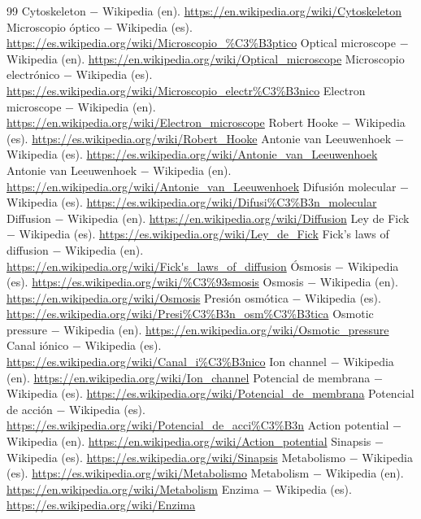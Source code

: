 \documentclass{book}
\begin{document}
\begin{thebibliography}{99}
 Cytoskeleton \(-\) Wikipedia (en). \url{https://en.wikipedia.org/wiki/Cytoskeleton}
 Microscopio óptico \(-\) Wikipedia (es). \url{https://es.wikipedia.org/wiki/Microscopio_%C3%B3ptico}
 Optical microscope \(-\) Wikipedia (en). \url{https://en.wikipedia.org/wiki/Optical_microscope}
 Microscopio electrónico \(-\) Wikipedia (es). \url{https://es.wikipedia.org/wiki/Microscopio_electr%C3%B3nico}
 Electron microscope \(-\) Wikipedia (en). \url{https://en.wikipedia.org/wiki/Electron_microscope}
 Robert Hooke \(-\) Wikipedia (es). \url{https://es.wikipedia.org/wiki/Robert_Hooke}
 Antonie van Leeuwenhoek \(-\) Wikipedia (es). \url{https://es.wikipedia.org/wiki/Antonie_van_Leeuwenhoek}
 Antonie van Leeuwenhoek \(-\) Wikipedia (en). \url{https://en.wikipedia.org/wiki/Antonie_van_Leeuwenhoek}
 Difusión molecular \(-\) Wikipedia (es). \url{https://es.wikipedia.org/wiki/Difusi%C3%B3n_molecular}
 Diffusion \(-\) Wikipedia (en). \url{https://en.wikipedia.org/wiki/Diffusion}
 Ley de Fick \(-\) Wikipedia (es). \url{https://es.wikipedia.org/wiki/Ley_de_Fick}
 Fick's laws of diffusion \(-\) Wikipedia (en). \url{https://en.wikipedia.org/wiki/Fick's_laws_of_diffusion}
 Ósmosis \(-\) Wikipedia (es). \url{https://es.wikipedia.org/wiki/%C3%93smosis}
 Osmosis \(-\) Wikipedia (en). \url{https://en.wikipedia.org/wiki/Osmosis}
 Presión osmótica \(-\) Wikipedia (es). \url{https://es.wikipedia.org/wiki/Presi%C3%B3n_osm%C3%B3tica}
 Osmotic pressure \(-\) Wikipedia (en). \url{https://en.wikipedia.org/wiki/Osmotic_pressure}
 Canal iónico \(-\) Wikipedia (es). \url{https://es.wikipedia.org/wiki/Canal_i%C3%B3nico}
 Ion channel \(-\) Wikipedia (en). \url{https://en.wikipedia.org/wiki/Ion_channel}
 Potencial de membrana \(-\) Wikipedia (es). \url{https://es.wikipedia.org/wiki/Potencial_de_membrana}
 Potencial de acción \(-\) Wikipedia (es). \url{https://es.wikipedia.org/wiki/Potencial_de_acci%C3%B3n}
 Action potential \(-\) Wikipedia (en). \url{https://en.wikipedia.org/wiki/Action_potential}
 Sinapsis \(-\) Wikipedia (es). \url{https://es.wikipedia.org/wiki/Sinapsis}
 Metabolismo \(-\) Wikipedia (es). \url{https://es.wikipedia.org/wiki/Metabolismo}
 Metabolism \(-\) Wikipedia (en). \url{https://en.wikipedia.org/wiki/Metabolism}
 Enzima \(-\) Wikipedia (es). \url{https://es.wikipedia.org/wiki/Enzima}

\end{thebibliography}
\end{document}
